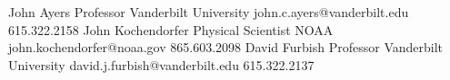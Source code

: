 %
%
%


\begin{referees}
		{John Ayers}
		{Professor}
		{Vanderbilt University}
		{john.c.ayers@vanderbilt.edu}
		{615.322.2158}
		{John Kochendorfer}
		{Physical Scientist}
		{NOAA}
		{john.kochendorfer@noaa.gov}
		{865.603.2098}
        {David Furbish}
        {Professor}
        {Vanderbilt University}
        {david.j.furbish@vanderbilt.edu}
        {615.322.2137}
\end{referees}